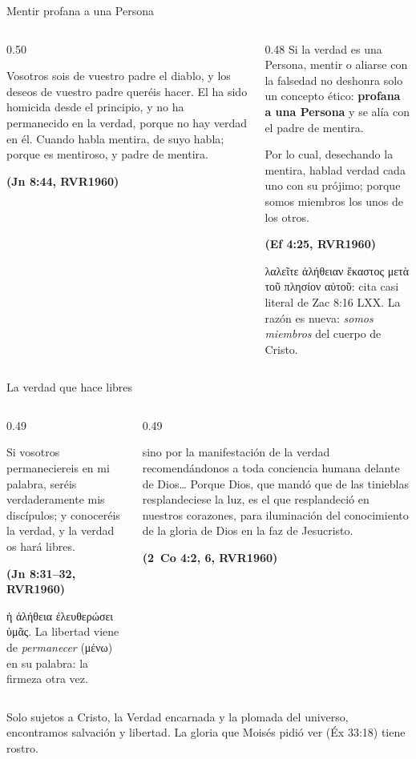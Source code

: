 \documentclass[hyperref={bookmarks=false},aspectratio=169]{beamer}
\newcommand{\grc}[1]{\foreignlanguage{ancientgreek}{#1}}
\newcommand{\fuente}[1]{\par\hfill{\upshape\bfseries\footnotesize\textcolor{azul}{#1}}}
\newcommand{\destacar}[1]{\textbf{\textcolor{azul}{#1}}}
\begin{document}
\begin{frame}{Mentir profana a una Persona}
\begin{columns}[t,onlytextwidth]
\begin{column}{0.50\textwidth}
\begin{cita}Vosotros sois de vuestro padre el diablo, y los deseos de vuestro padre queréis hacer. El ha sido homicida desde el principio, y no ha permanecido en la verdad, porque no hay verdad en él. Cuando habla mentira, de suyo habla; porque es mentiroso, y padre de mentira.\fuente{(Jn 8:44, RVR1960)}\end{cita}
\end{column}
\begin{column}{0.48\textwidth}\small
Si la verdad es una Persona, mentir o aliarse con la falsedad no deshonra solo un concepto ético: \destacar{profana a una Persona} y se alía con el padre de mentira.
\begin{cita}Por lo cual, desechando la mentira, hablad verdad cada uno con su prójimo; porque somos miembros los unos de los otros.\fuente{(Ef 4:25, RVR1960)}\end{cita}
\scriptsize\grc{λαλεῖτε ἀλήθειαν ἕκαστος μετὰ τοῦ πλησίον αὐτοῦ}: cita casi literal de Zac 8:16 LXX. La razón es nueva: \emph{somos miembros} del cuerpo de Cristo.
\end{column}
\end{columns}
\end{frame}

\begin{frame}{La verdad que hace libres}
\begin{columns}[t,onlytextwidth]
\begin{column}{0.49\textwidth}
\begin{cita}Si vosotros permaneciereis en mi palabra, seréis verdaderamente mis discípulos; y conoceréis la verdad, y la verdad os hará libres.\fuente{(Jn 8:31--32, RVR1960)}\end{cita}
\scriptsize\grc{ἡ ἀλήθεια ἐλευθερώσει ὑμᾶς}. La libertad viene de \emph{permanecer} (\grc{μένω}) en su palabra: la firmeza otra vez.
\end{column}
\begin{column}{0.49\textwidth}
\begin{cita}sino por la manifestación de la verdad recomendándonos a toda conciencia humana delante de Dios\ldots{} Porque Dios, que mandó que de las tinieblas resplandeciese la luz, es el que resplandeció en nuestros corazones, para iluminación del conocimiento de la gloria de Dios en la faz de Jesucristo.\fuente{(2~Co 4:2, 6, RVR1960)}\end{cita}
\end{column}
\end{columns}\par\smallskip
\small\RaggedRight Solo sujetos a Cristo, la Verdad encarnada y la plomada del universo, encontramos salvación y libertad. La gloria que Moisés pidió ver (Éx 33:18) tiene rostro.
\end{frame}
\end{document}
